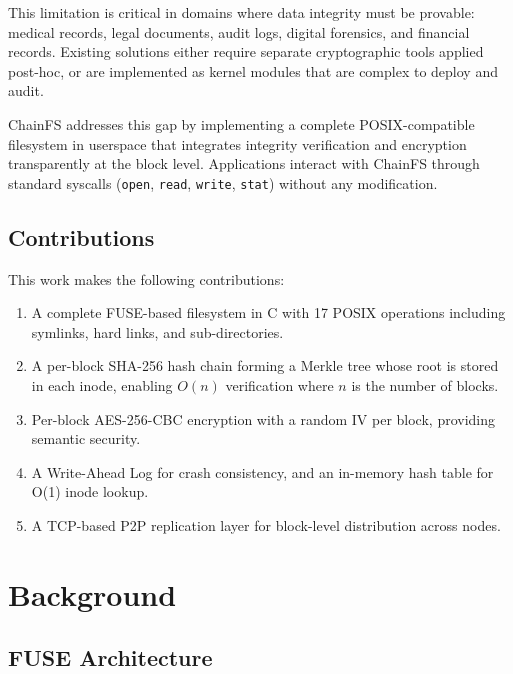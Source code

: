 \documentclass[10pt,twocolumn]{article}
\begin{document}
This limitation is critical in domains where
data integrity must be provable:
medical records, legal documents, audit logs,
digital forensics, and financial records.
Existing solutions either require separate
cryptographic tools applied post-hoc,
or are implemented as kernel modules that
are complex to deploy and audit.

ChainFS addresses this gap by implementing
a complete POSIX-compatible filesystem in
userspace that integrates integrity
verification and encryption transparently
at the block level.
Applications interact with ChainFS through
standard syscalls (\texttt{open},
\texttt{read}, \texttt{write}, \texttt{stat})
without any modification.

\subsection{Contributions}

This work makes the following contributions:

\begin{enumerate}[leftmargin=*, label=\arabic*.]
    \item A complete FUSE-based filesystem in C
    with 17 POSIX operations including
    symlinks, hard links, and sub-directories.

    \item A per-block SHA-256 hash chain
    forming a Merkle tree whose root is
    stored in each inode, enabling
    $O(n)$ verification where $n$ is
    the number of blocks.

    \item Per-block AES-256-CBC encryption
    with a random IV per block,
    providing semantic security.

    \item A Write-Ahead Log for crash
    consistency, and an in-memory hash table
    for O(1) inode lookup.

    \item A TCP-based P2P replication layer
    for block-level distribution across nodes.
\end{enumerate}

\section{Background}

\subsection{FUSE Architecture}
\end{document}
